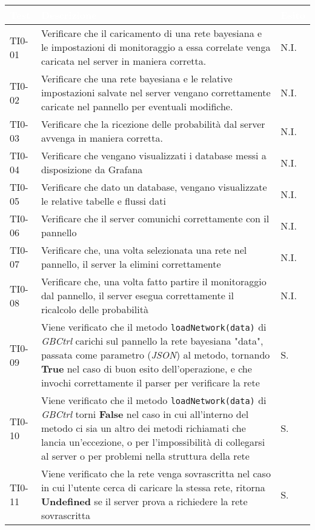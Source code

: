 \begin{longtable}{|C{.15\textwidth}|m{.52\textwidth}|m{.08\textwidth}|}
\hline
{}\textbf{\textcolor{white}{Test}} & \textbf{\textcolor{white}{Descrizione}} & \textbf{\textcolor{white}{Esito}}\\
\hline \hline
\endhead

TI0-01 & Verificare che il caricamento di una rete bayesiana e le impostazioni di monitoraggio a essa correlate venga caricata nel server in maniera corretta. & N.I. \\
\hline
{} TI0-02 & Verificare che una rete bayesiana e le relative impostazioni salvate nel server vengano correttamente caricate nel pannello per eventuali modifiche. & N.I. \\
\hline
TI0-03 & Verificare che la ricezione delle probabilità dal server avvenga in maniera corretta. & N.I. \\
\hline
{} TI0-04 & Verificare che vengano visualizzati i database messi a disposizione da Grafana & N.I. \\
\hline
TI0-05 & Verificare che dato un database, vengano visualizzate le relative tabelle e flussi dati & N.I. \\
\hline
{}TI0-06 & Verificare che il server comunichi correttamente con il pannello & N.I. \\
\hline
TI0-07 & Verificare che, una volta selezionata una rete nel pannello, il server la elimini correttamente & N.I. \\
\hline 
{}TI0-08 & Verificare che, una volta fatto partire il monitoraggio dal pannello, il server esegua correttamente il ricalcolo delle probabilità & N.I. \\  
\hline
TI0-09 & Viene verificato che il metodo \texttt{loadNetwork(data)} di \textit{GBCtrl} carichi sul pannello la rete bayesiana "data", passata come parametro (\textit{JSON}) al metodo, tornando \textbf{True} nel caso di buon esito dell'operazione, e che invochi correttamente il parser per verificare la rete & S.\\
\hline
{}TI0-10 & Viene verificato che il metodo \texttt{loadNetwork(data)} di \textit{GBCtrl} torni \textbf{False} nel caso in cui all'interno del metodo ci sia un altro dei metodi richiamati che lancia un'eccezione, o per l'impossibilità di collegarsi al server o per problemi nella struttura della rete  & S.\\
\hline
TI0-11 & Viene verificato che la rete venga sovrascritta nel caso in cui l'utente cerca di caricare la stessa rete, ritorna \textbf{Undefined} se il server prova a richiedere la rete sovrascritta & S. \\

\end{longtable}
